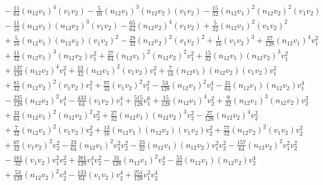 \documentclass[prd,preprint,superscriptaddress,tightenlines,nofootinbib,
  eqsecnum,showpacs]{revtex4}
\begin{document}
\begin{subequations}
\begin{align}
& \qquad -  \frac{11}{64} (n_{12} v_1)^4 (v_1 v_2)
 -  \frac{5}{16} (n_{12} v_1)^3 (n_{12} v_2) (v_1 v_2)
 -  \frac{15}{32} (n_{12} v_1)^2 (n_{12} v_2)^2 (v_1 v_2)\nonumber\\
& \qquad -  \frac{11}{16} (n_{12} v_1) (n_{12} v_2)^3 (v_1 v_2)
 -  \frac{65}{64} (n_{12} v_2)^4 (v_1 v_2)
 + \frac{5}{32} (n_{12} v_1)^2 (v_1 v_2)^2\nonumber\\
& \qquad + \frac{5}{16} (n_{12} v_1) (n_{12} v_2) (v_1 v_2)^2
 -  \frac{29}{32} (n_{12} v_2)^2 (v_1 v_2)^2
 + \frac{1}{16} (v_1 v_2)^3
 + \frac{27}{128} (n_{12} v_1)^4 v_1^{2}\nonumber\\
& \qquad + \frac{11}{32} (n_{12} v_1)^3 (n_{12} v_2) v_1^{2}
 + \frac{27}{64} (n_{12} v_1)^2 (n_{12} v_2)^2 v_1^{2}
 + \frac{15}{32} (n_{12} v_1) (n_{12} v_2)^3 v_1^{2}\nonumber\\
& \qquad + \frac{137}{128} (n_{12} v_2)^4 v_1^{2}
 + \frac{13}{32} (n_{12} v_1)^2 (v_1 v_2) v_1^{2}
 + \frac{7}{16} (n_{12} v_1) (n_{12} v_2) (v_1 v_2) v_1^{2}\nonumber\\
& \qquad + \frac{81}{32} (n_{12} v_2)^2 (v_1 v_2) v_1^{2}
 + \frac{97}{32} (v_1 v_2)^2 v_1^{2}
 -  \frac{53}{128} (n_{12} v_1)^2 v_1^{4}
 -  \frac{31}{64} (n_{12} v_1) (n_{12} v_2) v_1^{4}\nonumber\\
& \qquad -  \frac{225}{128} (n_{12} v_2)^2 v_1^{4}
 -  \frac{433}{64} (v_1 v_2) v_1^{4}
 + \frac{515}{128} v_1^{6}
 + \frac{15}{128} (n_{12} v_1)^4 v_2^{2}
 + \frac{9}{32} (n_{12} v_1)^3 (n_{12} v_2) v_2^{2}\nonumber\\
& \qquad + \frac{33}{64} (n_{12} v_1)^2 (n_{12} v_2)^2 v_2^{2}
 + \frac{27}{32} (n_{12} v_1) (n_{12} v_2)^3 v_2^{2}
 -  \frac{27}{128} (n_{12} v_2)^4 v_2^{2}\nonumber\\
& \qquad + \frac{7}{32} (n_{12} v_1)^2 (v_1 v_2) v_2^{2}
 + \frac{13}{16} (n_{12} v_1) (n_{12} v_2) (v_1 v_2) v_2^{2}
 + \frac{77}{32} (n_{12} v_2)^2 (v_1 v_2) v_2^{2}\nonumber\\
& \qquad + \frac{67}{32} (v_1 v_2)^2 v_2^{2}
 -  \frac{23}{64} (n_{12} v_1)^2 v_1^{2} v_2^{2}
 -  \frac{23}{32} (n_{12} v_1) (n_{12} v_2) v_1^{2} v_2^{2}
 -  \frac{157}{64} (n_{12} v_2)^2 v_1^{2} v_2^{2}\nonumber\\
& \qquad -  \frac{161}{32} (v_1 v_2) v_1^{2} v_2^{2}
 + \frac{381}{128} v_1^{4} v_2^{2}
 -  \frac{31}{128} (n_{12} v_1)^2 v_2^{4}
 -  \frac{53}{64} (n_{12} v_1) (n_{12} v_2) v_2^{4}\nonumber\\
& \left.\qquad + \frac{53}{128} (n_{12} v_2)^2 v_2^{4}
 -  \frac{123}{64} (v_1 v_2) v_2^{4}
 + \frac{251}{128} v_1^{2} v_2^{4}

\end{align}
\end{subequations}
\end{document}
